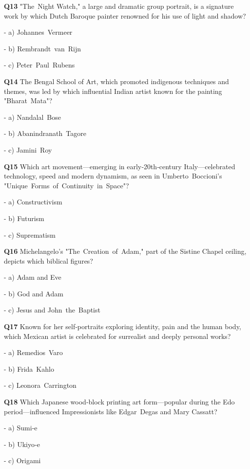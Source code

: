 \textbf{Q13} "The Night Watch," a large and dramatic group portrait, is a signature work by which Dutch Baroque painter renowned for his use of light and shadow?\par
\quad - a) Johannes Vermeer\par
\quad - b) Rembrandt van Rijn\par
\quad - c) Peter Paul Rubens\par

\textbf{Q14} The Bengal School of Art, which promoted indigenous techniques and themes, was led by which influential Indian artist known for the painting "Bharat Mata"?\par
\quad - a) Nandalal Bose\par
\quad - b) Abanindranath Tagore\par
\quad - c) Jamini Roy\par

\textbf{Q15} Which art movement—emerging in early‑20th‑century Italy—celebrated technology, speed and modern dynamism, as seen in Umberto Boccioni's "Unique Forms of Continuity in Space"?\par
\quad - a) Constructivism\par
\quad - b) Futurism\par
\quad - c) Suprematism\par

\textbf{Q16} Michelangelo's "The Creation of Adam," part of the Sistine Chapel ceiling, depicts which biblical figures?\par
\quad - a) Adam and Eve\par
\quad - b) God and Adam\par
\quad - c) Jesus and John the Baptist\par

\textbf{Q17} Known for her self‑portraits exploring identity, pain and the human body, which Mexican artist is celebrated for surrealist and deeply personal works?\par
\quad - a) Remedios Varo\par
\quad - b) Frida Kahlo\par
\quad - c) Leonora Carrington\par

\textbf{Q18} Which Japanese wood‑block printing art form—popular during the Edo period—influenced Impressionists like Edgar Degas and Mary Cassatt?\par
\quad - a) Sumi‑e\par
\quad - b) Ukiyo‑e\par
\quad - c) Origami\par

